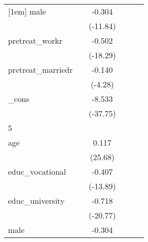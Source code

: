 {\begin{tabular}{l*{5}{c}}
[1em]
male        &                     &      -0.304\sym{***}&                     &                     &                     \\
            &                     &    (-11.84)         &                     &                     &                     \\
[1em]
pretreat\_workr&                     &      -0.502\sym{***}&                     &                     &                     \\
            &                     &    (-18.29)         &                     &                     &                     \\
[1em]
pretreat\_marriedr&                     &      -0.140\sym{***}&                     &                     &                     \\
            &                     &     (-4.28)         &                     &                     &                     \\
[1em]
\_cons      &                     &      -8.533\sym{***}&                     &                     &                     \\
            &                     &    (-37.75)         &                     &                     &                     \\
\hline
5           &                     &                     &                     &                     &                     \\
age         &                     &       0.117\sym{***}&                     &                     &                     \\
            &                     &     (25.68)         &                     &                     &                     \\
[1em]
educ\_vocational&                     &      -0.407\sym{***}&                     &                     &                     \\
            &                     &    (-13.89)         &                     &                     &                     \\
[1em]
educ\_university&                     &      -0.718\sym{***}&                     &                     &                     \\
            &                     &    (-20.77)         &                     &                     &                     \\
[1em]
male        &                     &      -0.304\sym{***}&                     &                     &                     \\

\end{tabular}}
